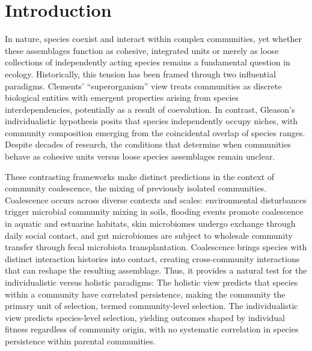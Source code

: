 \section{Introduction}
\label{sec:introduction}

In nature, species coexist and interact within complex communities, yet whether these assemblages function as cohesive, integrated units or merely as loose collections of independently acting species remains a fundamental question in ecology. Historically, this tension has been framed through two influential paradigms. Clements' ``superorganism'' view treats communities as discrete biological entities with emergent properties arising from species interdependencies, potentially as a result of coevolution\citep{Clements1916, Clements1936, Odum1969, Lovelock1979, WilsonSober1989}. In contrast, Gleason's individualistic hypothesis posits that species independently occupy niches, with community composition emerging from the coincidental overlap of species ranges\citep{Gleason1939, Cain1947, Mason1947, Whittaker1967}. Despite decades of research, the conditions that determine when communities behave as cohesive units versus loose species assemblages remain unclear.

These contrasting frameworks make distinct predictions in the context of community coalescence, the mixing of previously isolated communities\citep{Rillig2015, Lechon2021}. Coalescence occurs across diverse contexts and scales: environmental disturbances trigger microbial community mixing in soils\citep{Huet2023, Bresciani2025}, flooding events promote coalescence in aquatic and estuarine habitats\citep{Liu2024}, skin microbiomes undergo exchange through daily social contact\citep{Sarkar2024}, and gut microbiomes are subject to wholesale community transfer through fecal microbiota transplantation\citep{Xiao2020, Gupta2016}. Coalescence brings species with distinct interaction histories into contact, creating cross-community interactions that can reshape the resulting assemblage\citep{Rillig2015}. Thus, it provides a natural test for the individualistic versus holistic paradigms: The holistic view predicts that species within a community have correlated persistence, making the community the primary unit of selection, termed community-level selection. The individualistic view predicts species-level selection, yielding outcomes shaped by individual fitness regardless of community origin, with no systematic correlation in species persistence within parental communities.

